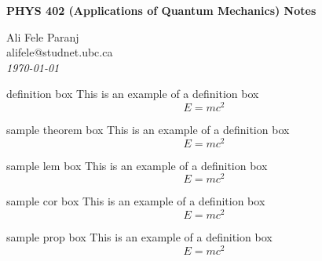 \documentclass[10pt]{article}
\begin{document}
\begin{tcolorbox}
  \begin{center}
  \begin{Large}
    \textbf{PHYS 402 (Applications of Quantum Mechanics) Notes} \\
    \vspace{5pt}
  \end{Large}
  \begin{large}
        Ali Fele Paranj \\
        alifele@studnet.ubc.ca\\
        
\vspace{5pt}
    \emph{\today}
  \end{large}
  \end{center}
\end{tcolorbox}




\begin{defbox}{definition box}
This is an example of a definition box
\begin{equation}
E = mc^2
\end{equation}
\end{defbox}


\begin{thmbox}{sample theorem box}
This is an example of a definition box
\begin{equation}
E = mc^2
\end{equation}
\end{thmbox}

\begin{lembox}{sample lem box}
This is an example of a definition box
\begin{equation}
E = mc^2
\end{equation}
\end{lembox}

\begin{corbox}{sample cor box}
This is an example of a definition box
\begin{equation}
E = mc^2
\end{equation}
\end{corbox}



\begin{propbox}{sample prop box}
This is an example of a definition box
\begin{equation}
E = mc^2
\end{equation}
\end{propbox}
\end{document}
